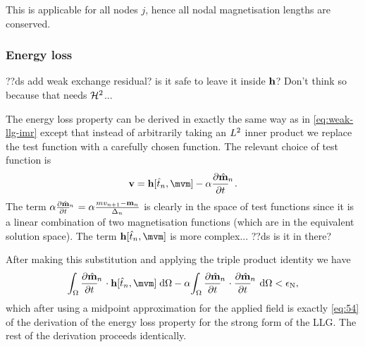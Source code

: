 This is applicable for all nodes $j$, hence all nodal magnetisation lengths are conserved.


\subsubsection{Energy loss}
??ds add weak exchange residual? is it safe to leave it inside $\mathbf{h}$? Don't think so because that needs $\mathcal{H}^2$...

The energy loss property can be derived in exactly the same way as in \cref{eq:weak-llg-imr} except that instead of arbitrarily taking an $L^2$ inner product we replace the test function with a carefully chosen function.
The relevant choice of test function is
\begin{equation}
  \testv = \hv[\tm, \mvm] - \dampc \dmdtm.
\end{equation}
The term $\dampc \dmdtm = \dampc\frac{mv_{n+1} - \mv_n}{\dtn}$ is clearly in the space of test functions since it is a linear combination of two magnetisation functions (which are in the equivalent solution space).
The term $\hv[\tm, \mvm]$ is more complex... ??ds is it in there?

After making this substitution and applying the triple product identity we have
\begin{equation}
  \intd{\dmdtm \cdot \hv[\tm, \mvm]} - \dampc \intd{\dmdtm \cdot \dmdtm} < \ntol,
\end{equation}
which after using a midpoint approximation for the applied field is exactly \cref{eq:54} of the derivation of the energy loss property for the strong form of the LLG.
The rest of the derivation proceeds identically.




